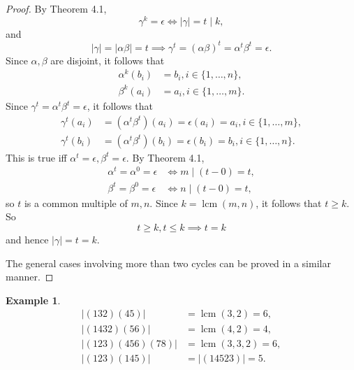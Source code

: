 \documentclass{article}
\DeclareMathOperator{\lcm}{lcm}
\theoremstyle{definition}
\newtheorem{example}{Example}[section]
\begin{document}
\begin{proof}
     By Theorem 4.1, 
     \begin{equation*}
         \gamma^k = \epsilon \iff |\gamma| = t \mid k,
     \end{equation*}
     and
     \begin{equation*}
         |\gamma| = |\alpha\beta| = t \implies \gamma^t = (\alpha\beta)^t = \alpha^t\beta^t = \epsilon.
     \end{equation*}
     Since $\alpha,\beta$ are disjoint, it follows that 
     \begin{align*}
         \alpha^k(b_i) &= b_i, i \in \{1,\dots,n\}, \\
         \beta^k(a_i) &= a_i, i \in \{1,\dots,m\}.
     \end{align*}
     Since $\gamma^t = \alpha^t\beta^t = \epsilon$, it follows that
     \begin{align*}
         \gamma^t(a_i) &= (\alpha^t\beta^t)(a_i) = \epsilon(a_i) = a_i, i \in \{1,\dots,m\}, \\
         \gamma^t(b_i) &= (\alpha^t\beta^t)(b_i) = \epsilon(b_i) = b_i, i \in \{1,\dots,n\}. 
     \end{align*}
     This is true iff $\alpha^t=\epsilon, \beta^t=\epsilon$. By Theorem 4.1, 
     \begin{align*}
         \alpha^t = \alpha^0 = \epsilon &\iff m \mid (t-0) = t, \\
         \beta^t = \beta^0 = \epsilon &\iff n \mid (t-0) = t,
     \end{align*}
     so $t$ is a common multiple of $m,n$. Since $k = \lcm(m,n)$, it follows that $t \geq k$. So
     \begin{equation*}
         t \geq k, t \leq k \implies t = k
     \end{equation*}
     and hence $|\gamma| = t = k$.
     
     The general cases involving more than two cycles can be proved in a similar manner.
 \end{proof}
 
 \begin{example}
 \begin{align*}
     |(132)(45)| &= \lcm(3,2) = 6, \\
     |(1432)(56)| &= \lcm(4,2) = 4, \\
     |(123)(456)(78)| &= \lcm(3,3,2) = 6, \\
     |(123)(145)| &= |(14523)| = 5. 
 \end{align*}
 \end{example}
 
\end{document}
